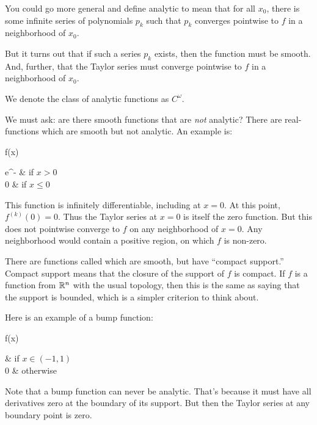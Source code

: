 \documentclass[11pt, oneside]{amsart}
\begin{document}
\begin{remark}
  You could go more general and define analytic to mean that for all
  $x_0$, there is some infinite series of polynomials $p_k$ such that
  $p_k$ converges pointwise to $f$ in a neighborhood of $x_0$.

  But it turns out that if such a series $p_k$ exists, then the function
  must be smooth. And, further, that the Taylor series must converge
  pointwise to $f$ in a neighborhood of $x_0$.
\end{remark}

\begin{remark}
  We denote the class of analytic functions as $C^\omega$.
\end{remark}

\begin{remark}
  We must ask: are there smooth functions that are \emph{not} analytic?
  There are real-functions which are smooth but not analytic. An example
  is:

  \begin{nedqn}
    f(x)
  \eqcol
    \begin{cases*}
      e^{-} & if $x > 0$ \\
      0 & if $ x \leq 0$
    \end{cases*}
  \end{nedqn}

  \noindent
  This function is infinitely differentiable, including at $x = 0$. At
  this point, $f^{(k)}(0) = 0$. Thus the Taylor series at $x = 0$ is
  itself the zero function. But this does not pointwise converge to $f$
  on any neighborhood of $x = 0$. Any neighborhood would contain a
  positive region, on which $f$ is non-zero.
\end{remark}

\begin{remark}
  There are functions called  which are smooth,
  but have ``compact support.'' Compact support means that the closure
  of the support of $f$ is compact. If $f$ is a function from $\mathbb{R}^n$
  with the usual topology, then this is the same as saying that the
  support is bounded, which is a simpler criterion to think about.

  Here is an example of a bump function:

  \begin{nedqn}
    f(x)
  \eqcol
    \begin{cases*}
       & if $x \in (-1, 1)$ \\
      0 & otherwise
    \end{cases*}
  \end{nedqn}

  \noindent
  Note that a bump function can never be analytic. That's because it
  must have all derivatives zero at the boundary of its support. But
  then the Taylor series at any boundary point is zero.
\end{remark}
\end{document}
